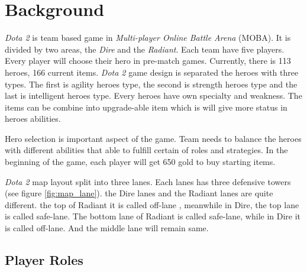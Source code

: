 \section{Background}
\label{sec:background}

\textit{Dota 2} is team based game in \textit{Multi-player Online Battle Arena} (MOBA). It is divided by two areas, the \textit{Dire} and the \textit{Radiant}. Each team have five players. Every player will choose their hero in pre-match games. Currently, there is 113 heroes, 166 current items. \textit{Dota 2} game design is separated the heroes with three types. The first is agility heroes type, the second is strength heroes type and the last is intelligent heroes type. Every heroes have own specialty and weakness. The items can be combine into upgrade-able item which is will give more status in heroes abilities.

Hero selection is important aspect of the game. Team needs to balance the heroes with different abilities that able to fulfill certain of roles and strategies. In the beginning of the game, each player will get 650 gold to buy starting items.

\textit{Dota 2} map layout split into three lanes. Each lanes has three defensive towers (see figure \ref{fig:map_lane}). the Dire lanes and the Radiant lanes are quite different. the top of Radiant it is called off-lane , meanwhile in Dire, the top lane is called safe-lane. The bottom lane of Radiant is called safe-lane, while in Dire it is called off-lane. And the middle lane will remain same.

\subsection{Player Roles}
\label{sec:player_roles}

